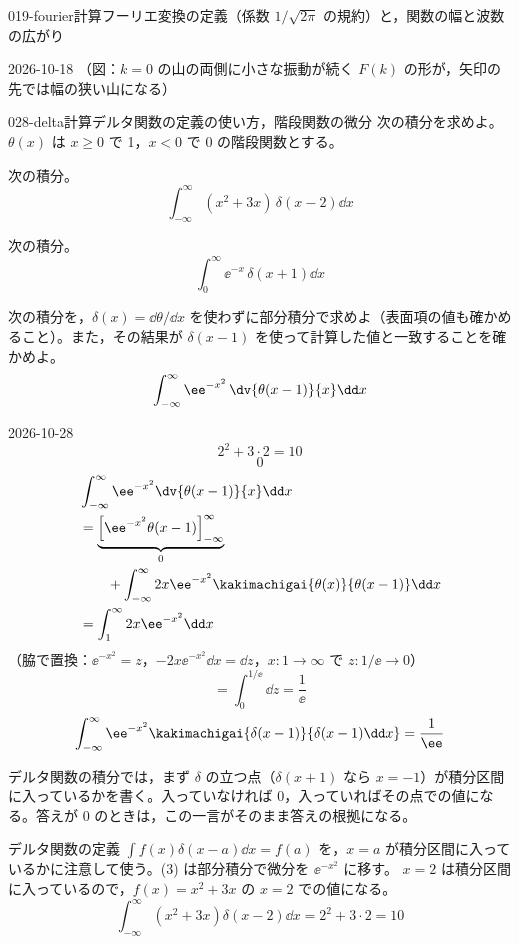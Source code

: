 \documentclass[uplatex,dvipdfmx,a4paper,11pt]{jsarticle}
\begin{document}
\begin{mondai}{019-fourier}{計算}{フーリエ変換の定義（係数 $1/\sqrt{2\pi}$ の規約）と，関数の幅と波数の広がり}
\begin{kotaeutsushi}{2026-10-18}
（図：$k=0$ の山の両側に小さな振動が続く $F(k)$ の形が，矢印の先では幅の狭い山になる）
\end{kotaeutsushi}
\end{mondai}

\begin{mondai}{028-delta}{計算}{デルタ関数の定義の使い方，階段関数の微分}
次の積分を求めよ。$\theta(x)$ は $x\ge 0$ で 1，$x<0$ で 0 の階段関数とする。
  \begin{shoumon}
    \item 次の積分。
    \[ \int_{-\infty}^{\infty}(x^{2}+3x)\,\delta(x-2)\dd x \]
    \item 次の積分。
    \[ \int_{0}^{\infty}\ee^{-x}\,\delta(x+1)\dd x \]
    \item 次の積分を，$\delta(x)=\dd \theta/\dd x$ を使わずに部分積分で求めよ（表面項の値も確かめること）。また，その結果が $\delta(x-1)$ を使って計算した値と一致することを確かめよ。
    \[ \int_{-\infty}^{\infty}\ee^{-x^{2}}\,\dv{\theta(x-1)}{x}\dd x \]
  \end{shoumon}
\begin{kotaeutsushi}{2026-10-28}
\[ 2^{2}+3\cdot2=10 \]
\[ 0 \]
\begin{align*}
&\int_{-\infty}^{\infty}\ee^{-x^{2}}\dv{\theta(x-1)}{x}\dd x\\
&=\underbrace{\Bigl[\ee^{-x^{2}}\theta(x-1)\Bigr]_{-\infty}^{\infty}}_{0}\\
&\qquad+\int_{-\infty}^{\infty}2x\ee^{-x^{2}}\kakimachigai{\theta(x)}{\theta(x-1)}\dd x\\
&=\int_{1}^{\infty}2x\ee^{-x^{2}}\dd x
\end{align*}
（脇で置換：$\ee^{-x^{2}}=z$，$-2x\ee^{-x^{2}}\dd x=\dd z$，$x:1\to\infty$ で $z:1/\ee\to0$）
\[ =\int_{0}^{1/\ee}\dd z=\frac{1}{\ee} \]
\[ \int_{-\infty}^{\infty}\ee^{-x^{2}}\kakimachigai{\delta(x-1)}{\delta(x-1)\dd x}=\frac{1}{\ee} \]
\end{kotaeutsushi}
\begin{kizuki}
\item デルタ関数の積分では，まず $\delta$ の立つ点（$\delta(x+1)$ なら $x=-1$）が積分区間に入っているかを書く。入っていなければ 0，入っていればその点での値になる。答えが 0 のときは，この一言がそのまま答えの根拠になる。
\end{kizuki}
\begin{tadashii}
\houshin デルタ関数の定義 $\int f(x)\delta(x-a)\dd x=f(a)$ を，$x=a$ が積分区間に入っているかに注意して使う。(3) は部分積分で微分を $\ee^{-x^{2}}$ に移す。
\keisan {} $x=2$ は積分区間に入っているので，$f(x)=x^{2}+3x$ の $x=2$ での値になる。
\[ \int_{-\infty}^{\infty}(x^{2}+3x)\delta(x-2)\dd x=2^{2}+3\cdot 2=10 \]


\end{tadashii}
\end{mondai}
\end{document}

